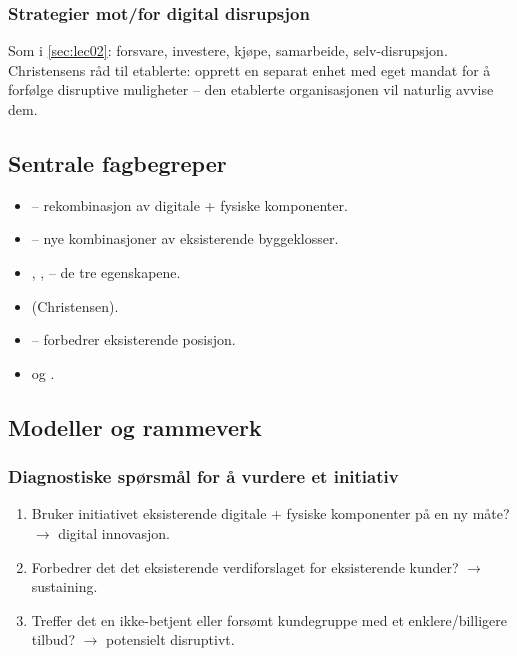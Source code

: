 \subsubsection*{Strategier mot/for digital disrupsjon}
Som i \autoref{sec:lec02}: forsvare, investere, kjøpe, samarbeide, selv-disrupsjon.
Christensens råd til etablerte: opprett en separat enhet med eget mandat for å
forfølge disruptive muligheter -- den etablerte organisasjonen vil naturlig
avvise dem.

\subsection{Sentrale fagbegreper}
\begin{itemize}
  \item {} -- rekombinasjon av digitale + fysiske
    komponenter.
  \item {} -- nye kombinasjoner av eksisterende byggeklosser.
  \item {}, , 
    -- de tre egenskapene.
  \item {} (Christensen).
  \item {} -- forbedrer eksisterende posisjon.
  \item {} og .
\end{itemize}

\subsection{Modeller og rammeverk}



\subsubsection*{Diagnostiske spørsmål for å vurdere et initiativ}
\begin{enumerate}
  \item Bruker initiativet eksisterende digitale + fysiske komponenter på en
    ny måte? $\rightarrow$ digital innovasjon.
  \item Forbedrer det det eksisterende verdiforslaget for eksisterende
    kunder? $\rightarrow$ sustaining.
  \item Treffer det en ikke-betjent eller forsømt kundegruppe med et
    enklere/billigere tilbud? $\rightarrow$ potensielt disruptivt.
\end{enumerate}

